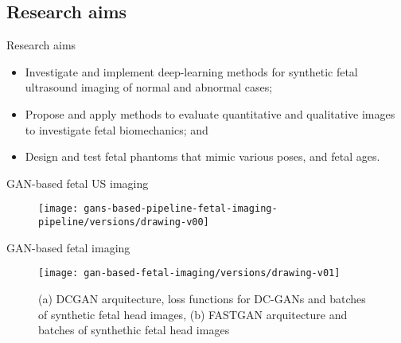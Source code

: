 \subsection{Research aims}


{
\begin{frame}{Research aims}	
\begin{itemize}
\item Investigate and implement deep-learning methods for synthetic fetal ultrasound imaging of normal and abnormal cases;
\item Propose and apply methods to evaluate quantitative and qualitative images to investigate fetal biomechanics; and 
\item Design and  test fetal phantoms that mimic various poses, and fetal ages.
\end{itemize}

\end{frame}
}



{
\begin{frame}{GAN-based fetal US imaging}
      \begin{figure}
        \centering
        \texttt{[image: gans-based-pipeline-fetal-imaging-pipeline/versions/drawing-v00]}
      \end{figure}
\end{frame}
}

{

\begin{frame}{GAN-based fetal imaging}
      \begin{figure}
        \centering
        \texttt{[image: gan-based-fetal-imaging/versions/drawing-v01]}
        \caption{(a) DCGAN arquitecture, loss functions for DC-GANs and batches of synthetic fetal head images,
		(b) FASTGAN arquitecture and batches of synthethic fetal head images}
      \end{figure}
\end{frame}
}

